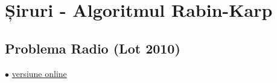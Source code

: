 \documentclass[../main.tex]{subfiles}
\begin{document}
\chapter{Șiruri - Algoritmul Rabin-Karp}

\section{Problema Radio (Lot 2010)}
\label{code:radio}
$\bullet$
\href{https://kilonova.ro/submissions/1113628}{versiune online}

\inputminted{cpp}{../src/strings/radio.cpp}
\end{document}
